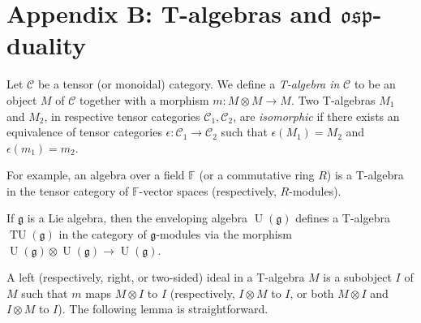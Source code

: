 \documentclass{emsprocart}
\begin{document}



\section*{Appendix B: T-algebras and $\mathfrak{osp}$-duality}
Let $\mathcal C$ be a tensor (or monoidal) category. We define a {\it T-algebra in}  $\mathcal C$ to be an object $M$ of $\mathcal C$ together with a morphism $m: M\otimes M\to M$. Two T-algebras $M_1$ and $M_2$, in respective tensor categories $\mathcal C_1, \mathcal C_2$, are {\it isomorphic} if there exists an equivalence of tensor categories $\epsilon: \mathcal C_1 \to\mathcal C_2$ such that $\epsilon(M_1)=M_2$ and $\epsilon(m_1)=m_2$.

For example, an algebra over a field $\mathbb F$ (or a commutative ring $R$) is a T-algebra in the tensor category of $\mathbb F$-vector spaces (respectively, $R$-modules).

If $\mathfrak g$ is a Lie algebra, then the enveloping algebra $\operatorname{U}(\mathfrak g)$ defines a T-algebra $\operatorname{TU}(\mathfrak g)$ in the category of $\mathfrak g$-modules via the morphism $\operatorname{U}(\mathfrak g)\otimes \operatorname{U}(\mathfrak g)\to\operatorname{U}(\mathfrak g)$.

A left (respectively, right, or two-sided) ideal in a T-algebra $M$ is a subobject $I$ of $M$ such that $m$ maps $M\otimes I$ to $I$ (respectively, $I\otimes M$ to $I$, or both $M\otimes I$ and $I\otimes M$ to $I$). The following lemma is straightforward.
\end{document}
